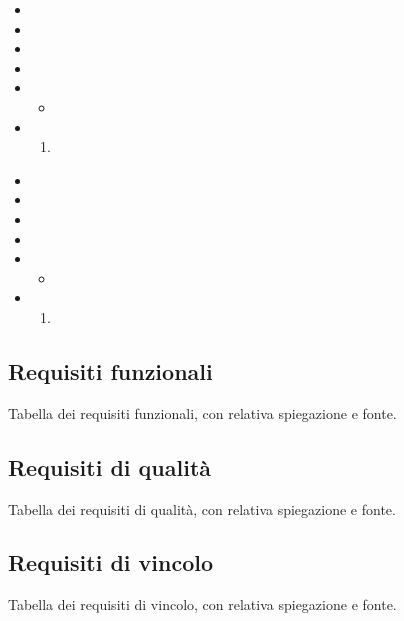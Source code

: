 \label{UC:extension.operation-not-allowed}

\begin{itemize}
  \item \UCPrimaryActors{}
  \item \UCSecondaryActors{}
  \item \UCPre{}
  \item \UCPost{}
  
  \item \UCMain{}
  \begin{itemize}
    \item 
  \end{itemize}
  
  \item \UCExt{}
  \begin{enumerate}[label=\lett]
    \item 
  \end{enumerate}
\end{itemize}

\label{UC:extension.opera-exists-yet}

\begin{itemize}
  \item \UCPrimaryActors{}
  \item \UCSecondaryActors{}
  \item \UCPre{}
  \item \UCPost{}
  
  \item \UCMain{}
  \begin{itemize}
    \item 
  \end{itemize}
  
  \item \UCExt{}
  \begin{enumerate}[label=\lett]
    \item 
  \end{enumerate}
\end{itemize}

\subsection{Requisiti funzionali}
Tabella dei requisiti funzionali, con relativa spiegazione e fonte.

\subsection{Requisiti di qualità}
Tabella dei requisiti di qualità, con relativa spiegazione e fonte.

\subsection{Requisiti di vincolo}
Tabella dei requisiti di vincolo, con relativa spiegazione e fonte.